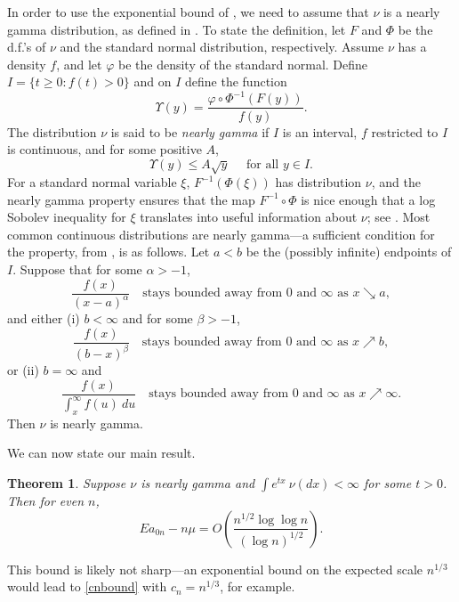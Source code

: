 \documentclass[12pt]{amsart}
\theoremstyle{plain}
\newtheorem{theorem}[lemma]{Theorem}
\theoremstyle{definition}
\numberwithin{equation}{section}
\begin{document}
In order to use the exponential bound of \cite{BR08}, we need to assume that $\nu$ is a nearly gamma distribution, as defined in \cite{BR08}.   To state the definition, let $F$ and $\Phi$ be the d.f.'s of $\nu$ and the standard normal distribution, respectively.   Assume $\nu$ has a density $f$, and let $\varphi$ be the density of the standard normal.  Define $I = \{t \geq 0: f(t)>0\}$ and on $I$ define the function
\[
  \Upsilon(y) = \frac{ \varphi \circ \Phi^{-1}(F(y)) }{ f(y) }.
  \]
The distribution $\nu$ is said to be \emph{nearly gamma} if $I$ is an interval, $f$ restricted to $I$ is continuous, and for some positive $A$,
\[
  \Upsilon(y) \leq A\sqrt{y} \quad \text{ for all } y \in I.
  \]
For a standard normal variable $\xi$, $F^{-1}(\Phi(\xi))$ has distribution $\nu$, and the nearly gamma property ensures that the map $F^{-1} \circ \Phi$ is nice enough that a log Sobolev inequality for $\xi$ translates into useful information about $\nu$; see \cite{BR08}.  Most common continuous distributions are nearly gamma---a sufficient condition for the property, from \cite{BR08}, is as follows.  Let $a<b$ be the (possibly infinite) endpoints of $I$.  Suppose that for some $\alpha>-1$,
\[
  \frac{f(x)}{(x-a)^\alpha} \quad\text{stays bounded away from 0 and $\infty$ as } x \searrow a,
  \]
and either (i) $b<\infty$ and for some $\beta>-1$,
\[
  \frac{f(x)}{(b-x)^\beta} \quad\text{stays bounded away from 0 and $\infty$ as } x \nearrow b,
  \]
or (ii) $b=\infty$ and 
\[
  \frac{f(x)}{ \int_x^\infty f(u)\ du} \quad\text{stays bounded away from 0 and $\infty$ as } x \nearrow \infty.
  \]
Then $\nu$ is nearly gamma.  

We can now state our main result.  

\begin{theorem}\label{main}
  Suppose $\nu$ is nearly gamma and $\int e^{tx}\ \nu(dx) < \infty$ for some $t>0$.  Then for even $n$,
  \begin{equation} \label{rate2}
  Ea_{0n} - n\mu = O\left( \frac{n^{1/2}\log \log n}{(\log n)^{1/2}} \right).
  \end{equation}
\end{theorem}

This bound is likely not sharp---an exponential bound on the expected scale $n^{1/3}$ would lead to \eqref{cnbound} with $c_n=n^{1/3}$, for example.
\end{document}
